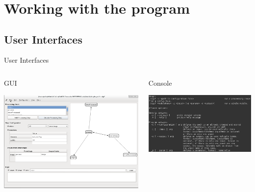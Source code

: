 \documentclass{beamer}
\begin{document}
\section{Working with the program}
\subsection{User Interfaces}
\begin{frame}[t]{User Interfaces}

	\begin{columns}
		\begin{column}[t]{.5\textwidth}
			\begin{center}
			{\Large GUI}
			\vspace{.5cm}

			\includegraphics[width=\textwidth]{images/howto/gui}

			\end{center}
		\end{column}
		\begin{column}[t]{.5\textwidth}
			\begin{center}
			{\Large Console}
			\vspace{.5cm}

			\includegraphics[width=\textwidth]{images/howto/console}


\end{center}
\end{column}
\end{columns}
\end{frame}
\end{document}
